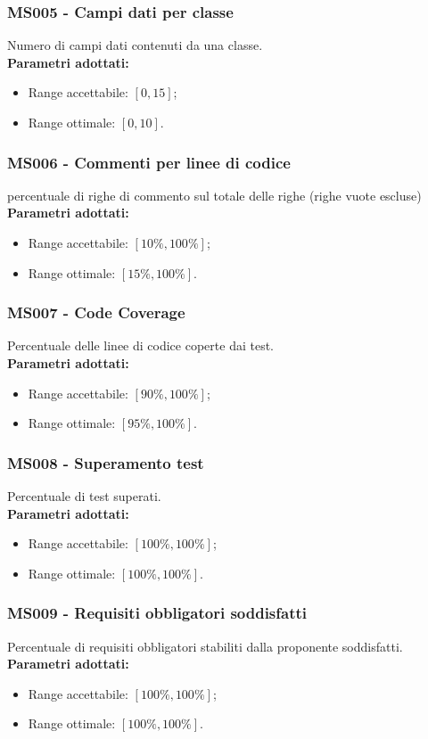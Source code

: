 \subsubsection{MS005 - Campi dati per classe}\mbox{}
Numero di campi dati contenuti da una classe. \\[0,2cm]
\textbf{Parametri adottati:}
\begin{itemize}
	\item Range accettabile: $[0,15]$;
	\item Range ottimale: $[0,10]$.
\end{itemize}

\subsubsection{MS006 - Commenti per linee di codice}\mbox{}
percentuale di righe di commento sul totale delle righe (righe vuote escluse) \\[0,2cm]
\textbf{Parametri adottati:}
\begin{itemize}
	\item Range accettabile: $[10\%,100\%]$;
	\item Range ottimale: $[15\%,100\%]$.
\end{itemize}

\subsubsection{MS007 - Code Coverage}\mbox{}
Percentuale delle linee di codice coperte dai test.\\[0,2cm]
\textbf{Parametri adottati:}
\begin{itemize}
	\item Range accettabile: $[90\%,100\%]$;
	\item Range ottimale: $[95\%,100\%]$.
\end{itemize}
\subsubsection{MS008 - Superamento test}\mbox{}
Percentuale di test superati. \\[0,2cm]
\textbf{Parametri adottati:}
\begin{itemize}
	\item Range accettabile: $[100\%,100\%]$;
	\item Range ottimale: $[100\%,100\%]$.
\end{itemize}

\subsubsection{MS009 - Requisiti obbligatori soddisfatti}\mbox{}
Percentuale di requisiti obbligatori stabiliti dalla proponente soddisfatti.\\[0,2cm]
\textbf{Parametri adottati:}
\begin{itemize}
	\item Range accettabile: $[100\%,100\%]$;
	\item Range ottimale: $[100\%,100\%]$.
\end{itemize}
	
